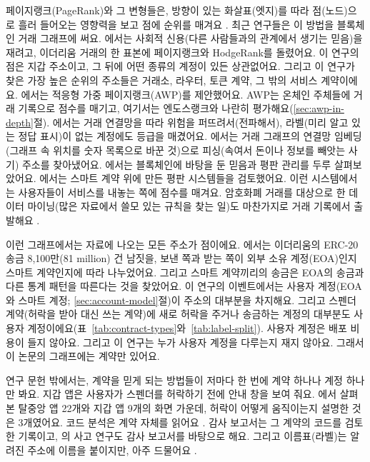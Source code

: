 페이지랭크(PageRank)와 그 변형들은, 방향이 있는 화살표(엣지)를 따라 점(노드)으로 흘러 들어오는 영향력을 보고 점에 순위를 매겨요 \parencite{page1999pagerank}. 최근 연구들은 이 방법을 블록체인 거래 그래프에 써요. \textcite{do2023hodgerank}에서는 사회적 신용(다른 사람들과의 관계에서 생기는 믿음)을 재려고, 이더리움 거래의 한 표본에 페이지랭크와 HodgeRank를 돌렸어요. 이 연구의 점은 지갑 주소이고, 그 뒤에 어떤 종류의 계정이 있든 상관없어요. 그리고 이 연구가 찾은 가장 높은 순위의 주소들은 거래소, 라우터, 토큰 계약, 그 밖의 서비스 계약이에요. \textcite{do2023awp}에서는 적응형 가중 페이지랭크(AWP)를 제안했어요. AWP는 온체인 주체들에 거래 기록으로 점수를 매기고, 여기서는 엔도스랭크와 나란히 평가해요(\ref{sec:awp-in-depth}절). \textcite{lin2025riskprop}에서는 거래 연결망을 따라 위험을 퍼뜨려서(전파해서), 라벨(미리 알고 있는 정답 표시)이 없는 계정에도 등급을 매겼어요. \textcite{wu2022phishers}에서는 거래 그래프의 연결망 임베딩(그래프 속 위치를 숫자 목록으로 바꾼 것)으로 피싱(속여서 돈이나 정보를 빼앗는 사기) 주소를 찾아냈어요. \textcite{bellini2020trust}에서는 블록체인에 바탕을 둔 믿음과 평판 관리를 두루 살펴보았어요. \textcite{almasoud2020reputation}에서는 스마트 계약 위에 만든 평판 시스템들을 검토했어요. 이런 시스템에서는 사용자들이 서비스를 내놓는 쪽에 점수를 매겨요. 암호화폐 거래를 대상으로 한 데이터 마이닝(많은 자료에서 쓸모 있는 규칙을 찾는 일)도 마찬가지로 거래 기록에서 출발해요 \parencite{liu2021knowledge}.

이런 그래프에서는 자료에 나오는 모든 주소가 점이에요. \textcite{mukhia2026erc20}에서는 이더리움의 ERC-20 송금 8,100만(81 million) 건 남짓을, 보낸 쪽과 받는 쪽이 외부 소유 계정(EOA)인지 스마트 계약인지에 따라 나누었어요. 그리고 스마트 계약끼리의 송금은 EOA의 송금과 다른 통계 패턴을 따른다는 것을 찾았어요. 이 연구의 이벤트에서는 사용자 계정(EOA와 스마트 계정; \ref{sec:account-model}절)이 주소의 대부분을 차지해요. 그리고 스펜더 계약(허락을 받아 대신 쓰는 계약)에 새로 허락을 주거나 송금하는 계정의 대부분도 사용자 계정이에요(표~\ref{tab:contract-types}와~\ref{tab:label-split}). 사용자 계정은 배포 비용이 들지 않아요. 그리고 이 연구는 누가 사용자 계정을 다루는지 재지 않아요. 그래서 이 논문의 그래프에는 계약만 있어요.

연구 문헌 밖에서는, 계약을 믿게 되는 방법들이 저마다 한 번에 계약 하나나 계정 하나만 봐요. 지갑 앱은 사용자가 스펜더를 허락하기 전에 안내 창을 보여 줘요. \textcite{wang2022unlimited}에서 살펴본 탈중앙 앱 22개와 지갑 앱 9개의 화면 가운데, 허락이 어떻게 움직이는지 설명한 것은 3개였어요. 코드 분석은 계약 자체를 읽어요 \parencite{lin2024crpwarner}. 감사 보고서는 그 계약의 코드를 검토한 기록이고, \textcite{zhou2023sok}의 사고 연구도 감사 보고서를 바탕으로 해요. 그리고 이름표(라벨)는 알려진 주소에 이름을 붙이지만, 아주 드물어요 \parencite{lin2024whoiswho}.


